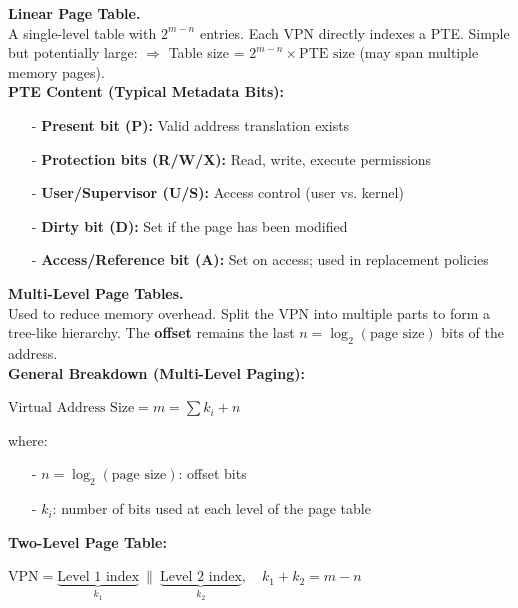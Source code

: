 \documentclass[8pt]{extarticle}
\begin{document}
\begin{minipage}[htp]{0.48\textwidth}
\begin{minipage}[htp]{1\textwidth}
    \noindent\textbf{Linear Page Table.} \\
    A single-level table with $2^{m - n}$ entries. Each VPN directly indexes a PTE. Simple but potentially large: $\Rightarrow$ Table size = $2^{m - n} \times \text{PTE size}$ (may span multiple memory pages).\\[5px]
    \noindent\textbf{PTE Content (Typical Metadata Bits):}
    \begin{itemize}[noitemsep,topsep=0pt]
        \item[-] \textbf{Present bit (P):} Valid address translation exists
        \item[-] \textbf{Protection bits (R/W/X):} Read, write, execute permissions
        \item[-] \textbf{User/Supervisor (U/S):} Access control (user vs. kernel)
        \item[-] \textbf{Dirty bit (D):} Set if the page has been modified
        \item[-] \textbf{Access/Reference bit (A):} Set on access; used in replacement policies
    \end{itemize}
    \vspace{5px}
    \noindent\textbf{Multi-Level Page Tables.} \\
    Used to reduce memory overhead. Split the VPN into multiple parts to form a tree-like hierarchy. The \textbf{offset} remains the last $n = \log_2(\text{page size})$ bits of the address.\\
    \noindent\textbf{General Breakdown (Multi-Level Paging):}
    \begin{center}
    $\text{Virtual Address Size} = m = \sum k_i + n$
    \end{center}
    \vspace{-5px}
    where:
    \begin{itemize}[noitemsep,topsep=0pt]
        \item[-] $n = \log_2(\text{page size})$: offset bits
        \item[-] $k_i$: number of bits used at each level of the page table
    \end{itemize}
    \vspace{5px}
    \noindent\textbf{Two-Level Page Table:}
\begin{center}$
    \text{VPN} = \underbrace{\text{Level 1 index}}_{k_1} \ \|\ \underbrace{\text{Level 2 index}}_{k_2}, \quad k_1 + k_2 = m - n
$\end{center}\vspace{-10px}
    \begin{itemize}[noitemsep,topsep=0pt]

\end{itemize}
\end{minipage}
\end{minipage}
\end{document}
